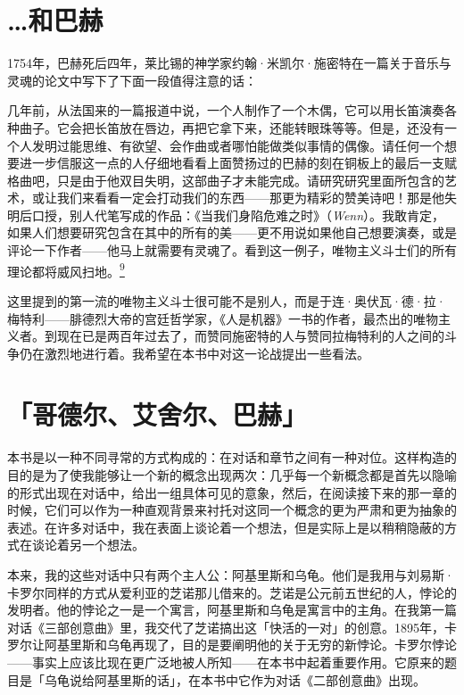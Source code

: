 \documentclass[
  12pt,
  twoside,
  openright,
  oldfontcommands,
]{memoir}
\newcommand{\westernital}[1]{{\rmfamily\itshape #1}}
\newenvironment{fsquote}{%
  \begin{mdframed}[style=gebquote]\kaitifamily\small%
}{%
  \end{mdframed}%
}
\begin{document}
\section{\ldots 和巴赫}

1754年，巴赫死后四年，莱比锡的神学家约翰·米凯尔·施密特在一篇关于音乐与灵魂的论文中写下了下面一段值得注意的话：

\begin{fsquote}
几年前，从法国来的一篇报道中说，一个人制作了一个木偶，它可以用长笛演奏各种曲子。它会把长笛放在唇边，再把它拿下来，还能转眼珠等等。但是，还没有一个人发明过能思维、有欲望、会作曲或者哪怕能做类似事情的偶像。请任何一个想要进一步信服这一点的人仔细地看看上面赞扬过的巴赫的刻在铜板上的最后一支赋格曲吧，只是由于他双目失明，这部曲子才未能完成。请研究研究里面所包含的艺术，或让我们来看看一定会打动我们的东西------那更为精彩的赞美诗吧！那是他失明后口授，别人代笔写成的作品：《当我们身陷危难之时》（\westernital{Wenn}）。我敢肯定，如果人们想要研究包含在其中的所有的美------更不用说如果他自己想要演奏，或是评论一下作者------他马上就需要有灵魂了。看到这一例子，唯物主义斗士们的所有理论都将威风扫地。\hyperref[fn:Introduction-9]{\textsuperscript{9}}
\end{fsquote}

这里提到的第一流的唯物主义斗士很可能不是别人，而是于连·奥伏瓦·德·拉·梅特利------腓德烈大帝的宫廷哲学家，《人是机器》一书的作者，最杰出的唯物主义者。到现在已是两百年过去了，而赞同施密特的人与赞同拉梅特利的人之间的斗争仍在激烈地进行着。我希望在本书中对这一论战提出一些看法。

\section{「哥德尔、艾舍尔、巴赫」}

本书是以一种不同寻常的方式构成的：在对话和章节之间有一种对位。这样构造的目的是为了使我能够让一个新的概念出现两次：几乎每一个新概念都是首先以隐喻的形式出现在对话中，给出一组具体可见的意象，然后，在阅读接下来的那一章的时候，它们可以作为一种直观背景来衬托对这同一个概念的更为严肃和更为抽象的表述。在许多对话中，我在表面上谈论着一个想法，但是实际上是以稍稍隐蔽的方式在谈论着另一个想法。

本来，我的这些对话中只有两个主人公：阿基里斯和乌龟。他们是我用与刘易斯·卡罗尔同样的方式从爱利亚的芝诺那儿借来的。芝诺是公元前五世纪的人，悖论的发明者。他的悖论之一是一个寓言，阿基里斯和乌龟是寓言中的主角。在我第一篇对话《三部创意曲》里，我交代了芝诺搞出这「快活的一对」的创意。1895年，卡罗尔让阿基里斯和乌龟再现了，目的是要阐明他的关于无穷的新悖论。卡罗尔悖论------事实上应该比现在更广泛地被人所知------在本书中起着重要作用。它原来的题目是「乌龟说给阿基里斯的话」，在本书中它作为对话《二部创意曲》出现。
\end{document}

